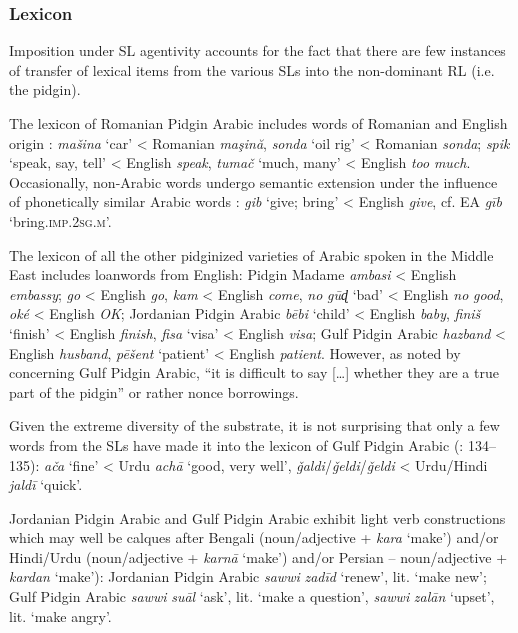 \documentclass[output=paper]{langsci/langscibook}
\begin{document}
 \subsubsection{Lexicon}

Imposition under SL agentivity accounts for the fact that there are few instances of transfer of lexical items from the various SLs into the non-dominant RL (i.e. the pidgin). 

The lexicon of Romanian Pidgin Arabic includes words of Romanian and English origin \citep[32]{Avram2010}: \textit{mašina} ‘car’ < Romanian \textit{maşină}, \textit{sonda} ‘oil rig’ < Romanian \textit{sonda}; \textit{spik} ‘speak, say, tell’ < English \textit{speak}, \textit{tumač} ‘much, many’ < English \textit{too} \textit{much}. Occasionally, non-Arabic words undergo semantic extension under the influence of phonetically similar Arabic words \citep[32]{Avram2010}: \textit{gib} ‘give; bring’ < English \textit{give}, cf. EA \textit{gīb} ‘bring.\textsc{imp.2sg.m}’. 

  The lexicon of all the other pidginized varieties of Arabic spoken in the Middle East includes loanwords from English: Pidgin Madame \textit{ambasi} < English \textit{embassy}; \textit{go} < English \textit{go}, \textit{kam} < English \textit{come}, \textit{no} \textit{gūɖ} ‘bad’ < English \textit{no} \textit{good}, \textit{oké} < English \textit{OK}; Jordanian Pidgin Arabic \textit{bēbi} ‘child’ < English \textit{baby}, \textit{finiš} ‘finish’ < English \textit{finish}, \textit{fisa} ‘visa’ < English \textit{visa}; Gulf Pidgin Arabic \textit{hazband} < English \textit{husband}, \textit{pēšent} ‘patient’ < English \textit{patient}. However, as noted by \citet[113]{Smart1990} concerning Gulf Pidgin Arabic, “it is difficult to say […] whether they are a true part of the pidgin” or rather nonce borrowings.  

Given the extreme diversity of the substrate, it is not surprising that only a few words from the SLs have made it into the lexicon of Gulf Pidgin Arabic (\citealt{Avram2017article}: 134–135): \textit{ača} ‘fine’ < Urdu \textit{achā} ‘good, very well’, \textit{ǧaldi}/\textit{ǧeldi}/\textit{ǧeldi} < Urdu/Hindi \textit{jaldī} ‘quick’. 

Jordanian Pidgin Arabic and Gulf Pidgin Arabic exhibit light verb constructions which may well be calques after Bengali (noun/adjective + \textit{kara} ‘make’) and/or Hindi/Urdu (noun/adjective + \textit{karnā} ‘make’) and/or Persian – noun/adjective + \textit{kardan} ‘make’): Jordanian Pidgin Arabic \textit{sawwi} \textit{zadīd} ‘renew’, lit. ‘make new’; Gulf Pidgin Arabic \textit{sawwi} \textit{suāl} ‘ask’, lit. ‘make a question’, \textit{sawwi} \textit{zalān} ‘upset’, lit. ‘make angry’. 
\end{document}
